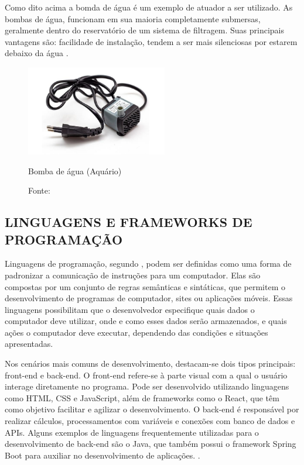             Como dito acima a bomda de água é um exemplo de atuador a ser utilizado. As bombas de água, funcionam em sua maioria completamente submersas, geralmente dentro do reservatório de um sistema de filtragem. Suas principais vantagens são: facilidade de instalação, tendem a ser mais silenciosas por estarem debaixo da água \cite{lucifabio2023aquario}.

            \begin{figure}[H]
                \centering
                \caption{ }  
                \centering
                \label{fig:cont}
                \includegraphics[width=0.55\textwidth]{imagens/bombaAgua.png}
                \caption*{Bomba de água (Aquário)}
                \caption*{Fonte: \cite{lucifabio2023aquario}}
            \end{figure}


    
    \subsection{LINGUAGENS E FRAMEWORKS DE PROGRAMAÇÃO}
        Linguagens de programação, segundo \cite{linguagemProgramacao}, podem ser definidas como uma forma de padronizar a comunicação de instruções para um computador. Elas são compostas por um conjunto de regras semânticas e sintáticas, que permitem o desenvolvimento de programas de computador, sites ou aplicações móveis. Essas linguagens possibilitam que o desenvolvedor especifique quais dados o computador deve utilizar, onde e como esses dados serão armazenados, e quais ações o computador deve executar, dependendo das condições e situações apresentadas.

        Nos cenários mais comuns de desenvolvimento, destacam-se dois tipos principais: front-end e back-end. O front-end refere-se à parte visual com a qual o usuário interage diretamente no programa. Pode ser desenvolvido utilizando linguagens como HTML, CSS e JavaScript, além de frameworks como o React, que têm como objetivo facilitar e agilizar o desenvolvimento. O back-end é responsável por realizar cálculos, processamentos com variáveis e conexões com banco de dados e APIs. Alguns exemplos de linguagens frequentemente utilizadas para o desenvolvimento de back-end são o Java, que também possui o framework Spring Boot para auxiliar no desenvolvimento de aplicações. \cite{dadesenvolvimento}.
        
